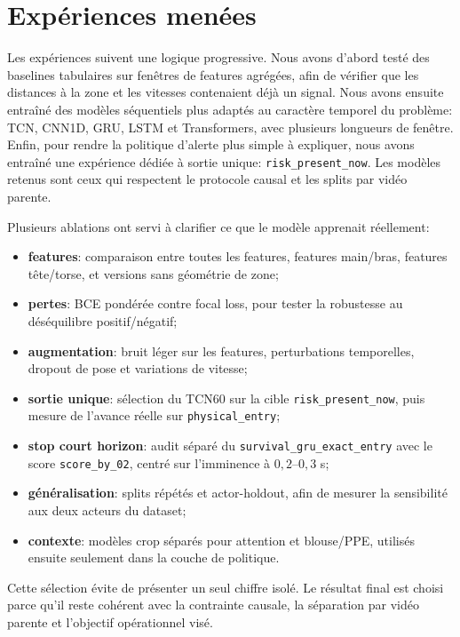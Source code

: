 \documentclass[11pt]{article}
\begin{document}
\section{Expériences menées}
Les expériences suivent une logique progressive. Nous avons d'abord testé des baselines tabulaires sur fenêtres de features agrégées, afin de vérifier que les distances à la zone et les vitesses contenaient déjà un signal. Nous avons ensuite entraîné des modèles séquentiels plus adaptés au caractère temporel du problème: TCN, CNN1D, GRU, LSTM et Transformers, avec plusieurs longueurs de fenêtre. Enfin, pour rendre la politique d'alerte plus simple à expliquer, nous avons entraîné une expérience dédiée à sortie unique: \texttt{risk\_present\_now}. Les modèles retenus sont ceux qui respectent le protocole causal et les splits par vidéo parente.

Plusieurs ablations ont servi à clarifier ce que le modèle apprenait réellement:
\begin{itemize}[leftmargin=*]
\item \textbf{features}: comparaison entre toutes les features, features main/bras, features tête/torse, et versions sans géométrie de zone;
\item \textbf{pertes}: BCE pondérée contre focal loss, pour tester la robustesse au déséquilibre positif/négatif;
\item \textbf{augmentation}: bruit léger sur les features, perturbations temporelles, dropout de pose et variations de vitesse;
\item \textbf{sortie unique}: sélection du TCN60 sur la cible \texttt{risk\_present\_now}, puis mesure de l'avance réelle sur \texttt{physical\_entry};
\item \textbf{stop court horizon}: audit séparé du \texttt{survival\_gru\_exact\_entry} avec le score \texttt{score\_by\_02}, centré sur l'imminence à $0,2$--$0,3$ s;
\item \textbf{généralisation}: splits répétés et actor-holdout, afin de mesurer la sensibilité aux deux acteurs du dataset;
\item \textbf{contexte}: modèles crop séparés pour attention et blouse/PPE, utilisés ensuite seulement dans la couche de politique.
\end{itemize}

Cette sélection évite de présenter un seul chiffre isolé. Le résultat final est choisi parce qu'il reste cohérent avec la contrainte causale, la séparation par vidéo parente et l'objectif opérationnel visé.
\end{document}
